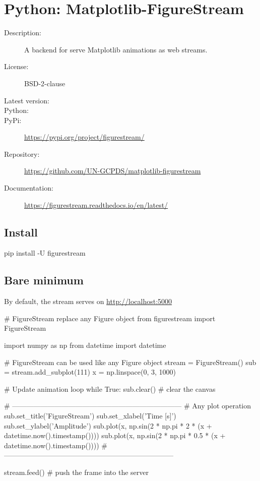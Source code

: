 \chapter{Python: Matplotlib-FigureStream}\label{appendix:matplotlib-figurestream}

\begin{description}
   \item[Description:]      A backend for serve Matplotlib animations as web streams.
   \item[License:]          BSD-2-clause
   \item[Latest version:]   
   \item[Python:]           
   \item[PyPi:]             \url{https://pypi.org/project/figurestream/}
   \item[Repository:]       \url{https://github.com/UN-GCPDS/matplotlib-figurestream}
   \item[Documentation:]    \url{https://figurestream.readthedocs.io/en/latest/}
\end{description}
\hrulefill

\section{Install}
\begin{python}
pip install -U figurestream
\end{python}

\section{Bare minimum}
By default, the stream serves on \url{http://localhost:5000}

\begin{python}
# FigureStream replace any Figure object
from figurestream import FigureStream

import numpy as np
from datetime import datetime

# FigureStream can be used like any Figure object
stream = FigureStream()
sub = stream.add_subplot(111)
x = np.linspace(0, 3, 1000)

# Update animation loop
while True:
    sub.clear()  # clear the canvas

    # ------------------------------------------------------------------------
    # Any plot operation
    sub.set_title('FigureStream')
    sub.set_xlabel('Time [s]')
    sub.set_ylabel('Amplitude')
    sub.plot(x, np.sin(2 * np.pi * 2 * (x + datetime.now().timestamp())))
    sub.plot(x, np.sin(2 * np.pi * 0.5 * (x + datetime.now().timestamp())))
    # ------------------------------------------------------------------------

    stream.feed()  # push the frame into the server
\end{python}

